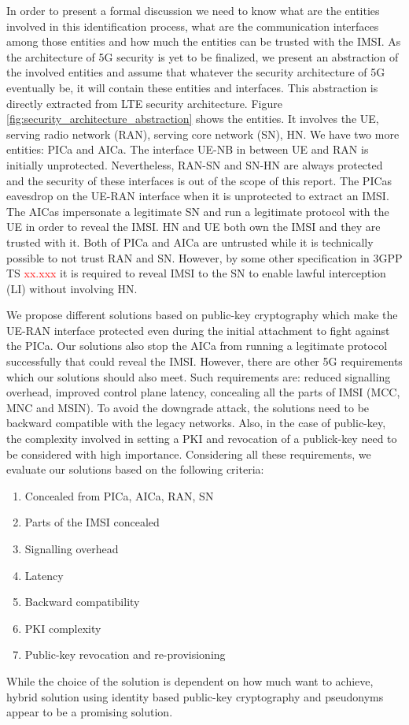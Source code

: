 \documentclass[lnicst,sechang,a4paper]{svmultln}
\begin{document}
In order to present a formal discussion we need to know what are the entities involved in this identification process, what are the communication interfaces among those entities and how much the entities can be trusted with the IMSI.  As the architecture of 5G security is yet to be finalized, we present an abstraction of the involved entities and assume that whatever the security architecture of 5G eventually be, it will contain these entities and interfaces. This abstraction is directly extracted from LTE security architecture. Figure \ref{fig:security_architecture_abstraction} shows the entities. It involves the UE, serving radio network (RAN), serving core network (SN), HN. We have two more entities: PICa and AICa. The interface  UE-NB in between UE and RAN is initially unprotected. Nevertheless, RAN-SN and SN-HN are always protected and the security of these interfaces is out of the scope of this report. The PICas eavesdrop on the UE-RAN interface when it is unprotected to extract an IMSI. The AICas impersonate a legitimate SN and run a legitimate protocol with the UE in order to reveal the IMSI. HN and UE both own the IMSI and they are trusted with it. Both of PICa and AICa are untrusted while it is technically possible to not trust RAN and SN. However, by some other specification in 3GPP TS \textcolor{red}{xx.xxx} it is required to reveal IMSI to the SN to enable lawful interception (LI) without involving HN. 

We propose different solutions based on public-key cryptography which make the UE-RAN interface protected even during the initial attachment to fight against the PICa. Our solutions also stop the AICa from running a legitimate protocol successfully that could reveal the IMSI. However, there are other 5G requirements which our solutions should also meet. Such requirements are: reduced signalling overhead, improved control plane latency, concealing all the parts of IMSI (MCC, MNC and MSIN). To avoid the downgrade attack, the solutions need to be backward compatible with the legacy networks. Also, in the case of public-key, the complexity involved in setting a PKI and revocation of a publick-key need to be considered with high importance. Considering all these requirements, we evaluate our solutions based on the following criteria:
\begin{enumerate}
\item Concealed from PICa, AICa, RAN, SN
\item Parts of the IMSI concealed
\item Signalling overhead
\item Latency
\item Backward compatibility
\item PKI complexity
\item Public-key revocation and re-provisioning 
\end{enumerate}
While the choice of the solution is dependent on how much want to achieve, hybrid solution using identity based public-key cryptography and pseudonyms appear to be a promising solution.
\end{document}
